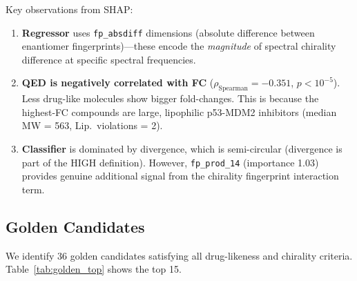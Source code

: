 \documentclass[11pt,a4paper]{article}
\newcommand{\rhosp}{\rho_{\text{Spearman}}}
\begin{document}
\noindent Key observations from SHAP:
\begin{enumerate}[nosep]
    \item \textbf{Regressor} uses \texttt{fp\_absdiff} dimensions (absolute
          difference between enantiomer fingerprints)---these encode the
          \emph{magnitude} of spectral chirality difference at specific
          spectral frequencies.
    \item \textbf{QED is negatively correlated with FC} ($\rhosp = -0.351$,
          $p < 10^{-5}$). Less drug-like molecules show bigger fold-changes.
          This is because the highest-FC compounds are large, lipophilic
          p53-MDM2 inhibitors (median MW = 563, Lip.\ violations = 2).
    \item \textbf{Classifier} is dominated by divergence, which is
          semi-circular (divergence is part of the HIGH definition).
          However, \texttt{fp\_prod\_14} (importance 1.03) provides genuine
          additional signal from the chirality fingerprint interaction term.
\end{enumerate}

\subsection{Golden Candidates}

We identify 36 golden candidates satisfying all drug-likeness and chirality
criteria. Table~\ref{tab:golden_top} shows the top 15.
\end{document}
